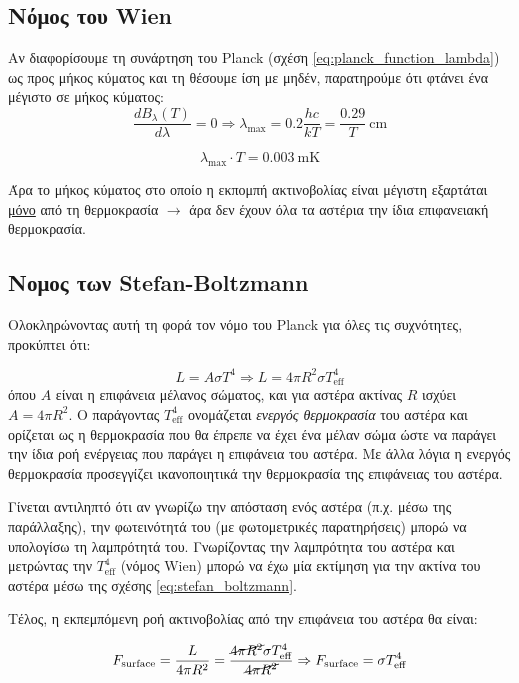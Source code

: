 \subsection{Νόμος του Wien}
Αν διαφορίσουμε τη συνάρτηση του Planck (σχέση \eqref{eq:planck_function_lambda}) ως προς μήκος κύματος και τη θέσουμε ίση με μηδέν, παρατηρούμε ότι φτάνει ένα μέγιστο σε μήκος κύματος:
$$\frac{d B_{\lambda}(T)}{d \lambda} = 0 \Rightarrow \lambda_{\text{max}} = 0.2 \frac{hc}{kT} = \frac{0.29}{T} \ \text{cm}$$

\begin{equation}
    \boxed{\lambda_{\text{max}} \cdot T = 0.003 \ \text{mK}}
\end{equation}

Άρα το μήκος κύματος στο οποίο η εκπομπή ακτινοβολίας είναι μέγιστη εξαρτάται \underline{μόνο} από τη θερμοκρασία $\longrightarrow$ άρα δεν έχουν όλα τα αστέρια την ίδια επιφανειακή θερμοκρασία.

\subsection{Νομος των Stefan-Boltzmann}
Ολοκληρώνοντας αυτή τη φορά τον νόμο του Planck για όλες τις συχνότητες, προκύπτει ότι:

\begin{equation}
    \label{eq:stefan_boltzmann}
    L = A \sigma T^4 \Rightarrow \boxed{L = 4 \pi R^2 \sigma T_{\text{eff}}^4}
\end{equation}
όπου $A$ είναι η επιφάνεια μέλανος σώματος, και για αστέρα ακτίνας $R$ ισχύει $A=4\pi R^2$. Ο παράγοντας $T_{\text{eff}}^4$ ονομάζεται \textit{ενεργός θερμοκρασία} του αστέρα και ορίζεται ως η θερμοκρασία που θα έπρεπε να έχει ένα μέλαν σώμα ώστε να παράγει την ίδια ροή ενέργειας που παράγει η επιφάνεια του αστέρα. Με άλλα λόγια η ενεργός θερμοκρασία προσεγγίζει ικανοποιητικά την θερμοκρασία της επιφάνειας του αστέρα.

Γίνεται αντιληπτό ότι αν γνωρίζω την απόσταση ενός αστέρα (π.χ. μέσω της παράλλαξης), την φωτεινότητά του (με φωτομετρικές παρατηρήσεις) μπορώ να υπολογίσω τη λαμπρότητά του. Γνωρίζοντας την λαμπρότητα του αστέρα και μετρώντας την $T_{\text{eff}}^4$ (νόμος Wien) μπορώ να έχω μία εκτίμηση για την ακτίνα του αστέρα μέσω της σχέσης \eqref{eq:stefan_boltzmann}.

Τέλος, η εκπεμπόμενη ροή ακτινοβολίας από την επιφάνεια του αστέρα θα είναι:

\begin{eqnarray}
    F_{\text{surface}} = \frac{L}{4 \pi R^2} = \frac{\cancel{4 \pi R^2} \sigma T_{\text{eff}}^4}{\cancel{4 \pi R^2}} \Rightarrow F_{\text{surface}} = \sigma T_{\text{eff}}^4
\end{eqnarray}


